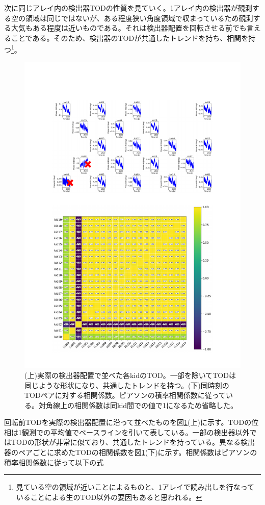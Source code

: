 次に同じアレイ内の検出器TODの性質を見ていく。1アレイ内の検出器が観測する空の領域は同じではないが、ある程度狭い角度領域で収まっているため観測する大気もある程度は近いものである。それは検出器配置を回転させる前でも言えることである。そのため、検出器のTODが共通したトレンドを持ち、相関を持つ\footnote{見ている空の領域が近いことによるものと、1アレイで読み出しを行なっていることによる生のTOD以外の要因もあると思われる。}。
\begin{figure}[htbp]
  \centering
  \includegraphics[width=1.0\columnwidth]{5_alignment/figs/9011_tod_cor_combined.pdf}
  \caption{(上)実際の検出器配置で並べた各kidのTOD。一部を除いてTODは同じような形状になり、共通したトレンドを持つ。(下)同時刻のTODペアに対する相関係数。ピアソンの積率相関係数に従っている。対角線上の相関係数は同kid間での値で1になるため省略した。}
  \label{9011_tod_cor_combined}
\end{figure}
回転前TODを実際の検出器配置に沿って並べたものを図\ref{9011_tod_cor_combined}(上)に示す。TODの位相は1観測での平均値でベースラインを引いて表している。一部の検出器以外ではTODの形状が非常に似ており、共通したトレンドを持っている。異なる検出器のペアごとに求めたTODの相関係数を図\ref{9011_tod_cor_combined}(下)に示す。相関係数はピアソンの積率相関係数に従って以下の式
